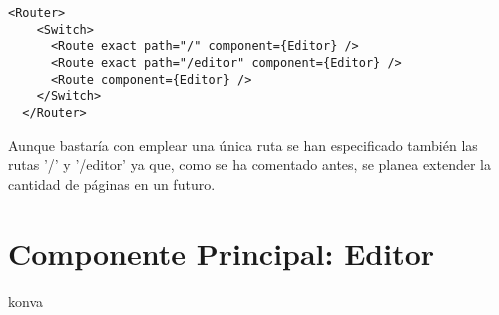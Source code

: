 \begin{lstlisting}[caption={App.js}]
  <Router>
    <Switch>
      <Route exact path="/" component={Editor} />
      <Route exact path="/editor" component={Editor} />
      <Route component={Editor} />
    </Switch>
  </Router>
\end{lstlisting}

Aunque bastaría con emplear una única ruta se han especificado también las rutas '/' y '/editor' 
ya que, como se ha comentado antes, se planea extender la cantidad de páginas en un futuro.

\section{Componente Principal: Editor}

konva

